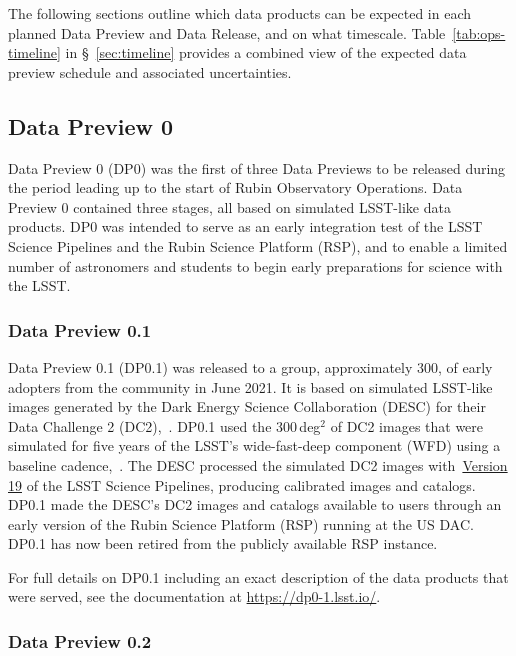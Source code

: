The following sections outline which data products can be expected in each planned Data Preview and Data Release, and on what timescale.
Table~\ref{tab:ops-timeline} in \S~\ref{sec:timeline} provides a combined view of the expected data preview schedule and associated uncertainties.

\subsection{Data Preview 0}
\label{sec:dp0}

Data Preview 0 (DP0) was the first of three Data Previews to be released during the period leading up to the start of Rubin Observatory Operations.
Data Preview 0 contained three stages, all based on simulated LSST-like data products.
DP0 was intended to serve as an early integration test of the LSST Science Pipelines and the Rubin Science Platform (RSP), and to enable a limited number of astronomers and students to begin early preparations for science with the LSST.

\subsubsection{Data Preview 0.1}
\label{sec:dp01}

Data Preview 0.1 (DP0.1) was released to a group, approximately 300,  of early adopters from the community in June 2021.
It is based on simulated LSST-like images generated by the Dark Energy Science Collaboration (DESC) for their Data Challenge 2 (DC2),~\citep[][]{2021ApJS..253...31L}.
DP0.1 used the 300\,deg$^{2}$ of DC2 images that were simulated for five years of the LSST’s wide-fast-deep component (WFD) using a baseline cadence,~.
The DESC processed the simulated DC2 images with~\href{https://pipelines.lsst.io/v/v19_0_0/index.html}{Version 19} of the LSST Science Pipelines, producing calibrated images and catalogs.
DP0.1 made the DESC’s DC2 images and catalogs available to users through an early version of the Rubin Science Platform (RSP) running at the US DAC.
DP0.1 has now been retired from the publicly available RSP instance.

For full details on DP0.1 including an exact description of the data products that were served, see the documentation at \url{https://dp0-1.lsst.io/}.

\subsubsection{Data Preview 0.2}
\label{sec:dp02}

